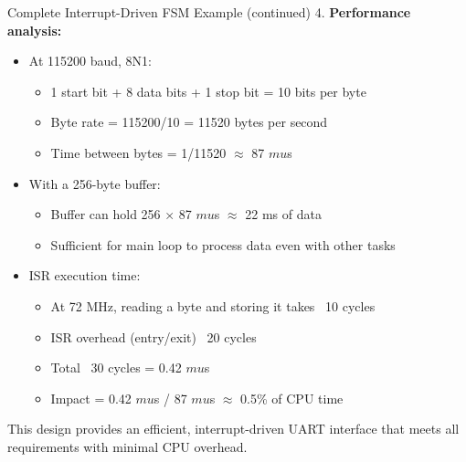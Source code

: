 \begin{example2}{Complete Interrupt-Driven FSM Example (continued)}
4. \textbf{Performance analysis:}
   \begin{itemize}
     \item At 115200 baud, 8N1:
     \begin{itemize}
       \item 1 start bit + 8 data bits + 1 stop bit = 10 bits per byte
       \item Byte rate = 115200/10 = 11520 bytes per second
       \item Time between bytes = 1/11520 $\approx$ 87 $mu$s
     \end{itemize}
     \item With a 256-byte buffer:
     \begin{itemize}
       \item Buffer can hold 256 × 87 $mu$s $\approx$ 22 ms of data
       \item Sufficient for main loop to process data even with other tasks
     \end{itemize}
     \item ISR execution time:
     \begin{itemize}
       \item At 72 MHz, reading a byte and storing it takes ~10 cycles
       \item ISR overhead (entry/exit) ~20 cycles
       \item Total ~30 cycles = 0.42 $mu$s
       \item Impact = 0.42 $mu$s / 87 $mu$s $\approx$ 0.5\% of CPU time
     \end{itemize}
   \end{itemize}

This design provides an efficient, interrupt-driven UART interface that meets all requirements with minimal CPU overhead.
\end{example2}
